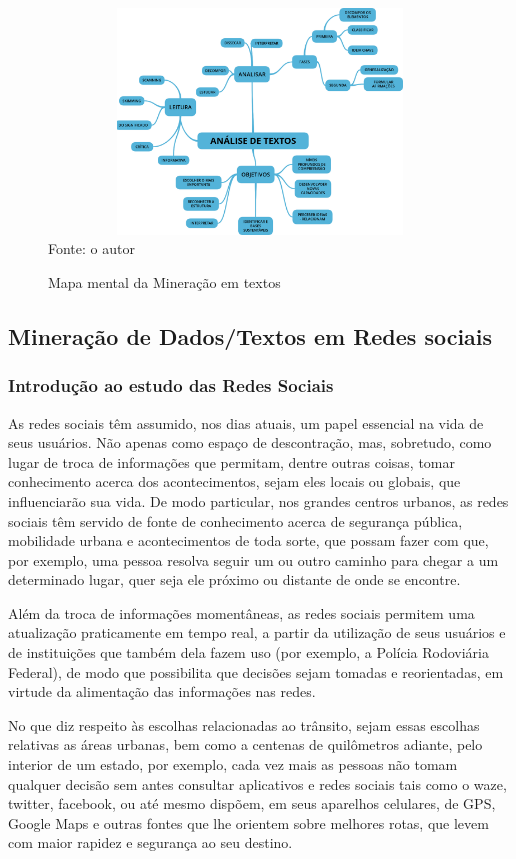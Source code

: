 \begin{figure}[htpb]
	\centering
	\caption{Mapa mental da Mineração em textos}
	\includegraphics[width=120mm, height=60mm]{Figuras/BigData/Analise_Textos.png}
	\tiny Fonte: o autor
\end{figure}


\subsection{Mineração de Dados/Textos em Redes sociais}

\subsubsection{Introdução ao estudo das Redes Sociais}

As redes sociais têm assumido, nos dias atuais, um papel essencial na vida de seus usuários. Não apenas como espaço de descontração, mas, sobretudo, como lugar de troca de informações que permitam, dentre outras coisas, tomar conhecimento acerca dos acontecimentos, sejam eles locais ou globais, que influenciarão sua vida. De modo particular, nos grandes centros urbanos, as redes sociais têm servido de fonte de conhecimento acerca de segurança pública, mobilidade urbana e acontecimentos de toda sorte, que possam fazer com que, por exemplo, uma pessoa resolva seguir um ou outro caminho para chegar a um determinado lugar, quer seja ele próximo ou distante de onde se encontre.

Além da troca de informações momentâneas, as redes sociais permitem uma atualização praticamente em tempo real, a partir da utilização de seus usuários e de instituições que também dela fazem uso (por exemplo, a Polícia Rodoviária Federal), de modo que possibilita que decisões sejam tomadas e reorientadas, em virtude da alimentação das informações nas redes.

No que diz respeito às escolhas relacionadas ao trânsito, sejam essas escolhas relativas as áreas urbanas, bem como a centenas de quilômetros adiante, pelo interior de um estado, por exemplo, cada vez mais as pessoas não tomam qualquer decisão sem antes consultar aplicativos e redes sociais tais como o waze, twitter, facebook, ou até mesmo dispõem, em seus aparelhos celulares, de GPS, Google Maps e outras fontes que lhe orientem sobre melhores rotas, que levem com maior rapidez e segurança ao seu destino.

